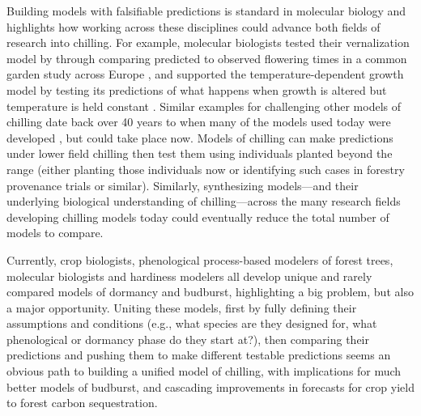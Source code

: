 \documentclass[11pt]{article}
\begin{document}
Building models with falsifiable predictions is standard in molecular biology and highlights how working across these disciplines could advance both fields of research into chilling. For example, molecular biologists tested their vernalization model by through comparing predicted to observed flowering times in a common garden study across Europe \citep[][]{Wilczek:2009oa}, and supported the temperature-dependent growth model by testing its predictions of what happens when growth is altered but temperature is held constant \citep{zhao2020temperature}. Similar examples for challenging other models of chilling date back over 40 years to when many of the models used today were developed \citep{richardson1974,chuine2016,ospreebbms}, but could take place now. Models of chilling can make predictions under lower field chilling then test them using individuals planted beyond the range (either planting those individuals now or identifying such cases in forestry provenance trials or similar). Similarly, synthesizing models---and their underlying biological understanding of chilling---across the many research fields developing chilling models today could eventually reduce the total number of models to compare. %


Currently, crop biologists, phenological process-based modelers of forest trees, molecular biologists and hardiness modelers all develop unique and rarely compared models of dormancy and budburst, highlighting a big problem, but also a major opportunity. Uniting these models, first by fully defining their assumptions and conditions (e.g., what species are they designed for, what phenological or dormancy phase do they start at?), then comparing their predictions and pushing them to make different testable predictions seems an obvious path to building a unified model of chilling, with implications for much better models of budburst, and cascading improvements in forecasts for crop yield to forest carbon sequestration. 
\end{document}
